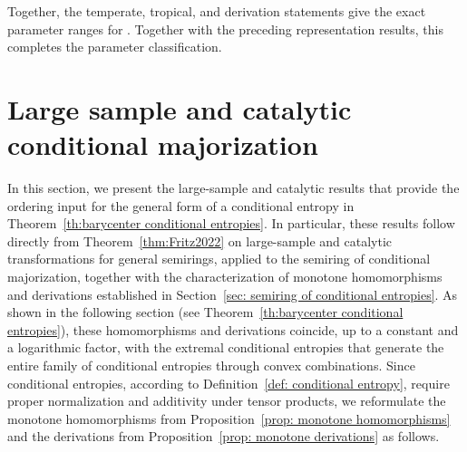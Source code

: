 \documentclass[aps,pra,11pt,onecolumn,nofootinbib,tightenlines]{revtex4-2}
\theoremstyle{definition}
\begin{document}
Together, the temperate, tropical, and derivation statements give the exact
parameter ranges for \ParameterMainFinalFamilies.  Together with the preceding
representation results, this completes the parameter classification.




\section{Large sample and catalytic conditional majorization}
\label{sec: large sample}
In this section, we present the large-sample and catalytic results that provide
the ordering input for the general form of a conditional entropy in
Theorem~\ref{th:barycenter conditional entropies}.
In particular, these results follow directly from Theorem~\ref{thm:Fritz2022} on large-sample and catalytic transformations for general semirings, applied to the semiring of conditional majorization, together with the characterization of monotone homomorphisms and derivations established in Section~\ref{sec: semiring of conditional entropies}.
As shown in the following section (see Theorem~\ref{th:barycenter conditional entropies}), these homomorphisms and derivations coincide, up to a constant and a logarithmic factor, with the extremal conditional entropies that generate the entire family of conditional entropies through convex combinations.
Since conditional entropies, according to Definition~\ref{def: conditional entropy}, require proper normalization and additivity under tensor products, we reformulate the monotone homomorphisms from Proposition~\ref{prop: monotone homomorphisms} and the derivations from Proposition~\ref{prop: monotone derivations} as follows.
\end{document}
